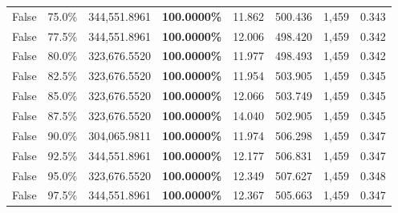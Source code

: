 \begin{table}[H]
\begin{tabular}{lllrllll}
\cline{1-8}
False & 75.0\% & 344,551.8961 & \bfseries \color{red} 100.0000\% & 11.862 & 500.436 & 1,459 & 0.343 \\
\cline{1-8}
False & 77.5\% & 344,551.8961 & \bfseries \color{red} 100.0000\% & 12.006 & 498.420 & 1,459 & 0.342 \\
\cline{1-8}
False & 80.0\% & 323,676.5520 & \bfseries \color{red} 100.0000\% & 11.977 & 498.493 & 1,459 & 0.342 \\
\cline{1-8}
False & 82.5\% & 323,676.5520 & \bfseries \color{red} 100.0000\% & 11.954 & 503.905 & 1,459 & 0.345 \\
\cline{1-8}
False & 85.0\% & 323,676.5520 & \bfseries \color{red} 100.0000\% & 12.066 & 503.749 & 1,459 & 0.345 \\
\cline{1-8}
False & 87.5\% & 323,676.5520 & \bfseries \color{red} 100.0000\% & 14.040 & 502.905 & 1,459 & 0.345 \\
\cline{1-8}
False & 90.0\% & \color{red} 304,065.9811 & \bfseries \color{red} 100.0000\% & 11.974 & 506.298 & 1,459 & 0.347 \\
\cline{1-8}
False & 92.5\% & 344,551.8961 & \bfseries \color{red} 100.0000\% & 12.177 & 506.831 & 1,459 & 0.347 \\
\cline{1-8}
False & 95.0\% & 323,676.5520 & \bfseries \color{red} 100.0000\% & 12.349 & 507.627 & 1,459 & 0.348 \\
\cline{1-8}
False & 97.5\% & 344,551.8961 & \bfseries \color{red} 100.0000\% & 12.367 & 505.663 & 1,459 & 0.347 \\
\cline{1-8}
\bottomrule
\end{tabular}
\end{table}

